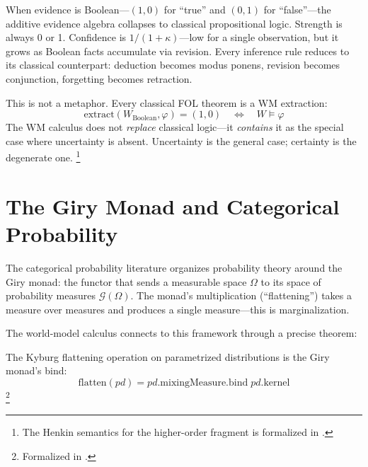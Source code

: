 \documentclass[11pt,openany]{report}
\begin{document}
When evidence is Boolean---$(1, 0)$ for ``true'' and $(0, 1)$ for
``false''---the additive evidence algebra collapses to classical
propositional logic.  Strength is always 0 or 1.  Confidence
is $1/(1+\kappa)$---low for a single observation, but it grows
as Boolean facts accumulate via revision.
Every inference rule reduces to its classical
counterpart: deduction becomes modus ponens, revision becomes
conjunction, forgetting becomes retraction.

This is not a metaphor.  Every classical FOL theorem is a WM
extraction:
\[
  \mathrm{extract}(W_{\mathrm{Boolean}}, \varphi) = (1, 0)
  \quad\Longleftrightarrow\quad
  W \vDash \varphi
\]
The WM calculus does not \emph{replace} classical logic---it
\emph{contains} it as the special case where uncertainty is absent.
Uncertainty is the general case; certainty is the degenerate one.%
\footnote{The Henkin semantics for the higher-order fragment is
formalized in
.}



\section{The Giry Monad and Categorical Probability}
\label{sec:bridge-giry}

The categorical probability literature organizes probability
theory around the Giry monad: the functor that sends a measurable
space $\Omega$ to its space of probability measures
$\mathcal{G}(\Omega)$.  The monad's multiplication
(``flattening'') takes a measure over measures and produces a
single measure---this is marginalization.

The world-model calculus connects to this framework through
a precise theorem:

\begin{theorem}[Kyburg flattening = Giry bind (\claimCore{})]
\label{thm:giry-flatten}
The Kyburg flattening operation on parametrized distributions
is the Giry monad's bind:
\[
  \mathrm{flatten}(\mathit{pd}) =
  \mathit{pd}.\mathrm{mixingMeasure}.\mathrm{bind}\;
  \mathit{pd}.\mathrm{kernel}
\]%
\footnote{Formalized in
.}
\end{theorem}
\end{document}
